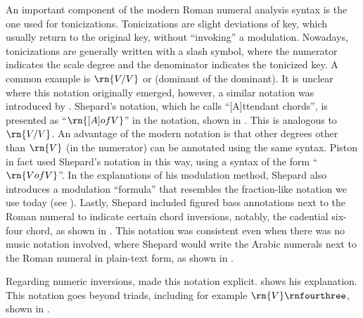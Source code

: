 An important component of the modern Roman numeral analysis
syntax is the one used for tonicizations. Tonicizations are
slight deviations of key, which usually return to the
original key, without ``invoking'' a modulation. Nowadays,
tonicizations are generally written with a slash symbol,
where the numerator indicates the scale degree and the
denominator indicates the tonicized key. A common example is
$\rn{V/V}$ or (dominant of the dominant). It is unclear
where this notation originally emerged, however, a similar
notation was introduced by \textcite{shepard1889how}.
Shepard's notation, which he calls ``[A]ttendant chords'',
is presented as ``$\rn{[A] of V}$'' in the notation, shown
in . This is
analogous to $\rn{V/V}$. An advantage of the modern notation
is that other degrees other than $\rn{V}$ (in the numerator)
can be annotated using the same syntax. Piston in fact used
Shepard's notation in this way, using a syntax of the form
``$\rn{V of V}$''. In the explanations of his modulation
method, Shepard also introduces a modulation ``formula''
that resembles the fraction-like notation we use today (see
). Lastly, Shepard
included figured bass annotations next to the Roman numeral
to indicate certain chord inversions, notably, the cadential
six-four chord, as shown in
. This
notation was consistent even when there was no music
notation involved, where Shepard would write the Arabic
numerals next to the Roman numeral in plain-text form, as
shown in .





Regarding numeric inversions, \textcite{chadwick1897harmony}
made this notation explicit.
shows his explanation. This notation goes beyond triads,
including for example $\rn{V}\rnfourthree$, shown in
.

